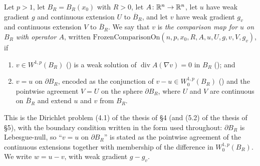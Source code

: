 \begin{definition}
Let $p>1$, let $B_R=B_R(x_0)$ with $R>0$, let $A\colon\mathbb{R}^n\to\mathbb{R}^n$, let $u$ have
weak gradient $g$ and continuous extension $U$ to $\overline B_R$, and let $v$
have weak gradient $g_v$ and continuous extension $V$ to $\overline B_R$.  We say
that $v$ is \emph{the comparison map for $u$ on $B_R$ with operator $A$},
written $\mathrm{FrozenComparisonOn}(n,p,x_0,R,A,u,U,g,v,V,g_v)$, if
\begin{enumerate}
\item $v\in W^{1,p}(B_R)$ () is a weak solution of
  $\operatorname{div}A(\nabla v)=0$ in $B_R$ (); and
\item $v=u$ on $\partial B_R$, encoded as the conjunction of
  $v-u\in W^{1,p}_0(B_R)$ () and the pointwise agreement
  $V=U$ on the sphere $\partial B_R$, where $U$ and $V$ are continuous on
  $\overline B_R$ and extend $u$ and $v$ from $B_R$.
\end{enumerate}
This is the Dirichlet problem (4.1) of the thesis of \S4 (and (5.2) of the thesis of \S5),
with the boundary condition written in the form used throughout: $\partial B_R$
is Lebesgue-null, so ``$v=u$ on $\partial B_R$'' is stated as the pointwise
agreement of the continuous extensions together with membership of the
difference in $W^{1,p}_0(B_R)$.  We write $w=u-v$, with weak gradient $g-g_v$.
\end{definition}
